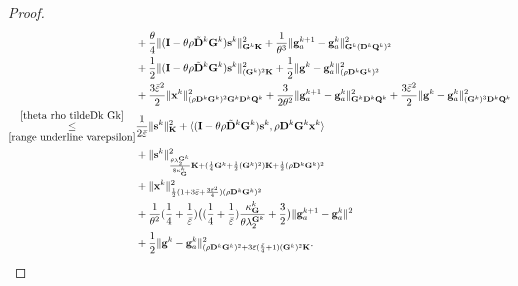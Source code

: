 \documentclass[12pt,draftcls,onecolumn]{IEEEtran}
\newcommand{\bG}{{\mathbf{G}}}
\newcommand{\bK}{{\mathbf{K}}}
\newcommand{\bD}{{\mathbf{D}}}
\begin{document}
\begin{proof}
\begin{align}
	&+ \frac{\theta}{4}\|(\mathbf{I}-\theta\rho \tilde{\mathbf{D}}^k\bG^k)\mathbf{s}^k\|^2_{\mathbf{G}^k\mathbf{K}} + \frac{1}{\theta^3}\|\mathbf{g}_a^{k+1}-\mathbf{g}_a^k\|^2_{\mathbf{G}^k(\mathbf{D}^k\mathbf{Q}^k)^2}\notag\\
	&+ \frac{1}{2}\|(\mathbf{I}-\theta\rho \tilde{\mathbf{D}}^k\bG^k)\mathbf{s}^k\|^2_{(\mathbf{G}^k)^2\mathbf{K}} + \frac{1}{2}\|\mathbf{g}^k-\mathbf{g}_a^k\|^2_{(\rho\mathbf{D}^k\bG^k )^2} \notag\\
	& +\frac{3\bar{\varepsilon}^2}{2}\|\mathbf{x}^k\|^2_{(\rho\mathbf{D}^k\mathbf{G}^k)^2\mathbf{G}^k\mathbf{D}^k\mathbf{Q}^k} + \frac{3}{2\theta^2}\|\mathbf{g}_a^{k+1}-\mathbf{g}_a^k\|^2_{\mathbf{G}^k\mathbf{D}^k\mathbf{Q}^k}+ \frac{3\bar{\varepsilon}^2}{2}\|\mathbf{g}^k-\mathbf{g}_a^k\|^2_{(\mathbf{G}^k)^3\mathbf{D}^k\mathbf{Q}^k}\notag\\
	\underset{\eqref{range underline varepsilon}}{\overset{\eqref{theta rho tildeDk Gk}}{\leq}}& \frac{1}{2\bar{\varepsilon}}\|\mathbf{s}^{k}\|^2_{\bK}+ \langle (\mathbf{I}-\theta\rho \tilde{\mathbf{D}}^k\bG^k)\mathbf{s}^k, \rho \mathbf{D}^k\mathbf{G}^k \mathbf{x}^k \rangle \notag\\
	& + \|\mathbf{s}^k\|^2_{\frac{\theta\lambda_2^{\bG^k}}{8\kappa_\bG^k}\bK+ (\frac{1}{4}\mathbf{G}^k+\frac{1}{2}(\mathbf{G}^k)^2)\mathbf{K}+\frac{1}{2}(\rho\mathbf{D}^k\mathbf{G}^k)^2}\notag\\
	&+\|\mathbf{x}^k\|^2_{\frac{1}{2}(1+3\bar{\varepsilon}+\frac{3\bar{\varepsilon}^2}{4})(\rho \mathbf{D}^k\mathbf{G}^k)^2} \notag\\
	&+ \frac{1}{\theta^2}(\frac{1}{4}+\frac{1}{\bar{\varepsilon}})\big((\frac{1}{4}+\frac{1}{\bar{\varepsilon}})\frac{\kappa_{\bG}^k}{\theta\lambda_2^{\bG^k}}+\frac{3}{2}\big) \|\mathbf{g}_a^{k+1}-\mathbf{g}_a^k\|^2\notag\\
	&+\frac{1}{2}\|\mathbf{g}^k-\mathbf{g}_a^k\|^2_{(\rho\mathbf{D}^k\mathbf{G}^k)^2+3\bar{\varepsilon}(\frac{\bar{\varepsilon}}{4}+1)(\bG^k)^2\mathbf{K}}.

\end{align}
\end{proof}
\end{document}
